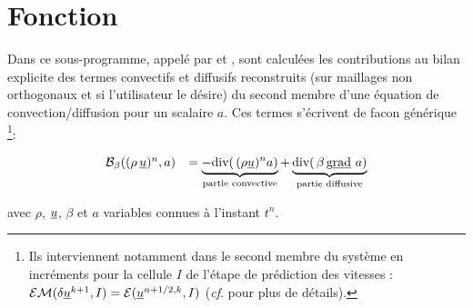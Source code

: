 %
% 
%
% 
% 
% 
%
%

\vspace{1cm}
\section{Fonction}

  Dans ce sous-programme, appel\'e par  et , sont calcul\'ees les contributions au bilan explicite des termes
convectifs et diffusifs reconstruits
(sur maillages non orthogonaux et si l'utilisateur le d\'esire) du second membre
d'une \'equation de convection/diffusion pour un scalaire $a$. Ces termes s'\'ecrivent de
facon g\'en\'erique \footnote{Ils interviennent notamment dans le second
membre du syst\`eme en incr\'ements pour la cellule $I$ de l'\'etape de pr\'ediction des vitesses : $\mathcal{EM}(\delta\underline{u}^{k+1},I) =
\mathcal{E}(\underline{u}^{n+1/2,k},I)$  ({\it cf}.  pour plus de d\'etails).}:

\begin{equation}\label{Base_Bilsc2_eq_continue}
\begin{array}{ll}
\mathcal{B_{\mathcal{\beta}}}((\rho\,\underline{u})^{n},a) 
&=\underbrace{-\text{div}(\,(\rho \underline{u})^{n}a)}_{\text {partie convective}}
+\underbrace{\text{div}(\,\beta\,\text{g}\underline{\text{rad}}\  a)}_{\text{partie diffusive}}\\
\end{array}
\end{equation}

avec $\rho$, $\underline{u}$, $\beta$ et $a$ variables connues \`a l'instant ${t^n}$. 

